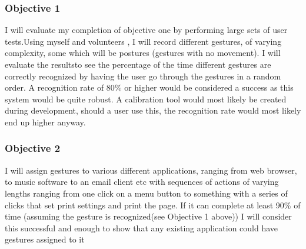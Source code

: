 \documentclass[a4paper]{article}
\begin{document}
\subsubsection{Objective 1}
I will evaluate my completion of objective one by performing large sets of user tests.Using myself and volunteers , I will record different gestures, of varying complexity, some which will be postures (gestures with no movement). I will evaluate the resultsto see the percentage of the time different gestures are correctly recognized by having the user go through the gestures in a random order. A recognition rate of 80\% or higher would be considered a success as this system would be quite robust. A calibration tool would most likely be created during development, should a user use this, the recognition rate would most likely end up higher anyway.
\subsubsection{Objective 2}
I will assign gestures to various different applications, ranging from web browser, to music software to an email client etc with sequences of actions of varying lengths ranging from one click on a menu button to something with a series of clicks that set print settings and print the page. If it can complete at least 90\% of time (assuming the gesture is recognized(see Objective 1 above)) I will consider this successful and enough to show that any existing application could have gestures assigned to it
\end{document}
